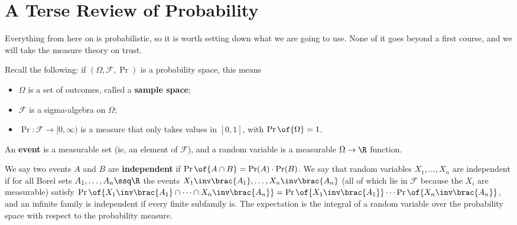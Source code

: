 \section{A Terse Review of Probability}

Everything from here on is probabilistic, so it is worth setting down what we are going to use. None of it goes beyond a first course, and we will take the measure theory on trust.

Recall the following: if $(\Omega, \mathcal{F}, \Pr)$ is a probability space, this means
\begin{itemize}
    \item $\Omega$ is a set of outcomes, called a \textbf{sample space};
    \item $\mathcal{F}$ is a sigma-algebra on $\Omega$;
    \item $\Pr : \mathcal{F} \to [0, \infty)$ is a measure that only takes values in $[0, 1]$, with $\Pr\of{\Omega} = 1$.
\end{itemize}
An \textbf{event} is a measurable set (ie, an element of $\mathcal{F}$), and a random variable is a measurable $\Omega \to \R$ function.

We say two events $A$ and $B$ are \textbf{independent} if $\Pr\of{A \cap B} = \Pr(A) \cdot \Pr(B)$. We say that random variables $X_1, \ldots, X_n$ are independent if for all Borel sets $A_1, \ldots, A_n \ssq \R$ the events $X_1\inv\brac{A_1}, \ldots, X_n\inv\brac{A_n}$ (all of which lie in $\mathcal{F}$ because the $X_i$ are measurable) satisfy $\Pr\of{X_1\inv\brac{A_1} \cap \cdots \cap X_n\inv\brac{A_n}} = \Pr\of{X_1\inv\brac{A_1}} \cdots \Pr\of{X_n\inv\brac{A_n}}$, and an infinite family is independent if every finite subfamily is. The expectation is the integral of a random variable over the probability space with respect to the probability measure.

